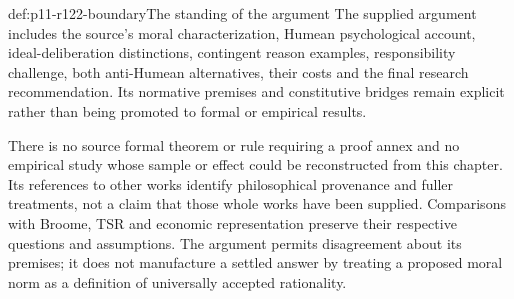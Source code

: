 \begin{proofboundary}{def:p11-r122-boundary}{The standing of the argument}
The supplied argument includes the source's moral characterization,
Humean psychological account, ideal-deliberation distinctions, contingent
reason examples, responsibility challenge, both anti-Humean alternatives,
their costs and the final research recommendation. Its normative
premises and constitutive bridges remain explicit rather than being
promoted to formal or empirical results.

There is no source formal theorem or rule requiring a proof annex and
no empirical study whose sample or effect could be reconstructed from
this chapter. Its references to other works identify philosophical
provenance and fuller treatments, not a claim that those whole works
have been supplied. Comparisons with Broome, TSR and economic
representation preserve their respective questions and assumptions.
The argument permits disagreement about its premises; it does not
manufacture a settled answer by treating a proposed moral norm as a
definition of universally accepted rationality.
\end{proofboundary}

